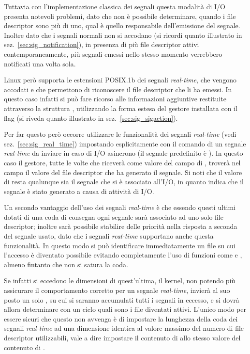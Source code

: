 Tuttavia con l'implementazione classica dei segnali questa modalità di I/O
presenta notevoli problemi, dato che non è possibile determinare, quando i
file descriptor sono più di uno, qual è quello responsabile dell'emissione del
segnale. Inoltre dato che i segnali normali non si accodano (si ricordi quanto
illustrato in sez.~\ref{sec:sig_notification}), in presenza di più file
descriptor attivi contemporaneamente, più segnali emessi nello stesso momento
verrebbero notificati una volta sola.

Linux però supporta le estensioni POSIX.1b dei segnali \textit{real-time}, che
vengono accodati e che permettono di riconoscere il file descriptor che li ha
emessi.  In questo caso infatti si può fare ricorso alle informazioni
aggiuntive restituite attraverso la struttura , utilizzando
la forma estesa  del gestore installata con il flag
 (si riveda quanto illustrato in
sez.~\ref{sec:sig_sigaction}).

Per far questo però occorre utilizzare le funzionalità dei segnali
\textit{real-time} (vedi sez.~\ref{sec:sig_real_time}) impostando
esplicitamente con il comando  di  un segnale
\textit{real-time} da inviare in caso di I/O asincrono (il segnale predefinito
è ). In questo caso il gestore, tutte le volte che riceverà
 come valore del campo  di ,
troverà nel campo  il valore del file descriptor che ha generato
il segnale. Si noti che il valore di resta 
qualunque sia il segnale che si è associato all'I/O, in quanto indica che il
segnale è stato generato a causa di attività di I/O.

Un secondo vantaggio dell'uso dei segnali \textit{real-time} è che essendo
questi ultimi dotati di una coda di consegna ogni segnale sarà associato ad
uno solo file descriptor; inoltre sarà possibile stabilire delle priorità
nella risposta a seconda del segnale usato, dato che i segnali
\textit{real-time} supportano anche questa funzionalità. In questo modo si può
identificare immediatamente un file su cui l'accesso è diventato possibile
evitando completamente l'uso di funzioni come  e ,
almeno fintanto che non si satura la coda.

Se infatti si eccedono le dimensioni di quest'ultima, il kernel, non potendo
più assicurare il comportamento corretto per un segnale \textit{real-time},
invierà al suo posto un solo , su cui si saranno accumulati
tutti i segnali in eccesso, e si dovrà allora determinare con un ciclo quali
sono i file diventati attivi. L'unico modo per essere sicuri che questo non
avvenga è di impostare la lunghezza della coda dei segnali \textit{real-time}
ad una dimensione identica al valore massimo del numero di file descriptor
utilizzabili, vale a dire impostare il contenuto di
 allo stesso valore del contenuto di
.

